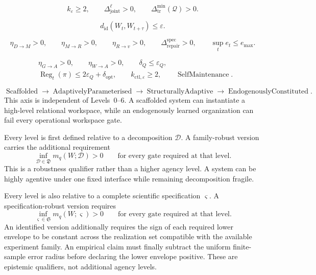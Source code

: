 \[
k_\varepsilon\geq2,
\qquad
\Delta_{\mathrm{joint}}^\ell>0,
\qquad
\Delta_{\mathrm{tr}}^{\min}(\mathcal Q)>0.
\]

\[
d_{\mathrm{id}}(W_t,W_{t+\tau})
\leq\varepsilon.
\]

\[
\eta_{D\to M}>0,
\qquad
\eta_{M\to R}>0,
\qquad
\eta_{R\to v}>0,
\qquad
\Delta_{\mathrm{repair}}^{\mathrm{spec}}>0,
\qquad
\sup_t e_t\leq e_{\max}.
\]

\[
\begin{aligned}
&\eta_{G\to A}>0,
\qquad
\eta_{W\to A}>0,
\qquad
\delta_Q\leq\varepsilon_Q,\\
&\operatorname{Reg}_t(\pi)
 \leq2\varepsilon_Q+\delta_{\mathrm{opt}},
\qquad
k_{\mathrm{ctl},\varepsilon}\geq2,
\qquad
\operatorname{SelfMaintenance}.
\end{aligned}
\]

\[
\operatorname{Scaffolded}
\longrightarrow
\operatorname{AdaptivelyParameterised}
\longrightarrow
\operatorname{StructurallyAdaptive}
\longrightarrow
\operatorname{EndogenouslyConstituted}.
\]
This axis is independent of Levels~0--6. A scaffolded system can instantiate a
high-level relational workspace, while an endogenously learned organization
can fail every operational workspace gate.


Every level is first defined relative to a decomposition \(\mathcal D\). A
family-robust version carries the additional requirement
\[
\inf_{\mathcal D\in\mathfrak D}
 m_q(W;\mathcal D)>0
\qquad
\text{for every gate required at that level}.
\]
This is a robustness qualifier rather than a higher agency level. A system can
be highly agentive under one fixed interface while remaining decomposition
fragile.


Every level is also relative to a complete scientific specification
\(\varsigma\). A specification-robust version requires
\[
\inf_{\varsigma\in\mathfrak S}
 m_q(W;\varsigma)>0
\qquad
\text{for every gate required at that level}.
\]
An identified version additionally requires the sign of each required lower
envelope to be constant across the realization set compatible with the
available experiment family. An empirical claim must finally subtract the
uniform finite-sample error radius before declaring the lower envelope
positive. These are epistemic qualifiers, not additional agency levels.

